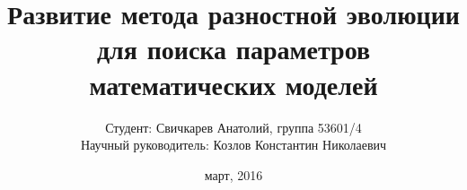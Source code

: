 \documentclass{beamer}
\begin{document}
\title[Развитие ППРЭ]
{Развитие метода разностной эволюции
для поиска параметров математических моделей}
\author[Свичкарев Анатолий]
{Студент: Свичкарев Анатолий, группа 53601/4\\
Научный руководитель: Козлов Константин Николаевич}
\date{март, 2016}

\frame{\titlepage} 

\end{document}
